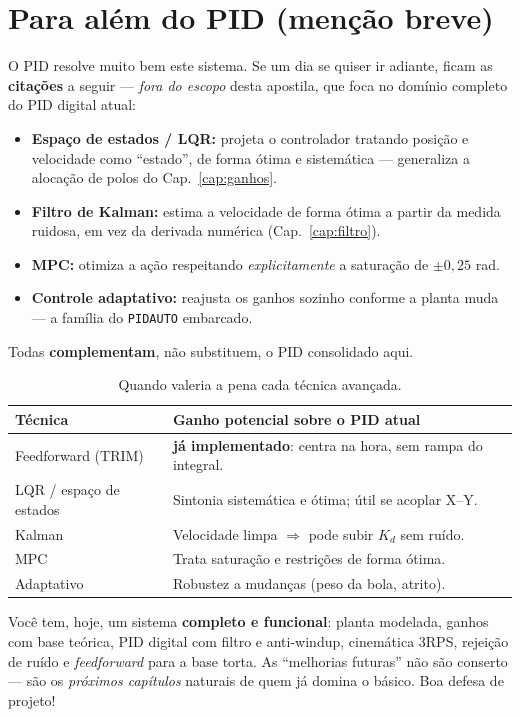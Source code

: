 \section{Para al\'em do PID (men\c{c}\~ao breve)}
O PID resolve muito bem este sistema. Se um dia se quiser ir adiante, ficam as
\textbf{cita\c{c}\~oes} a seguir --- \emph{fora do escopo} desta apostila, que foca
no dom\'inio completo do PID digital atual:
\begin{itemize}[leftmargin=1.4em]
  \item \textbf{Espa\c{c}o de estados / LQR:} projeta o controlador tratando
  posi\c{c}\~ao e velocidade como ``estado'', de forma \'otima e sistem\'atica ---
  generaliza a aloca\c{c}\~ao de polos do Cap.~\ref{cap:ganhos}.
  \item \textbf{Filtro de Kalman:} estima a velocidade de forma \'otima a partir da
  medida ruidosa, em vez da derivada num\'erica (Cap.~\ref{cap:filtro}).
  \item \textbf{MPC:} otimiza a a\c{c}\~ao respeitando \emph{explicitamente} a
  satura\c{c}\~ao de $\pm0{,}25$ rad.
  \item \textbf{Controle adaptativo:} reajusta os ganhos sozinho conforme a planta
  muda --- a fam\'ilia do \texttt{PIDAUTO} embarcado.
\end{itemize}
Todas \textbf{complementam}, n\~ao substituem, o PID consolidado aqui.

\begin{table}[h]\centering
\caption{Quando valeria a pena cada t\'ecnica avan\c{c}ada.}
\label{tab:avancado}
\small
\begin{tabularx}{\textwidth}{l X}
\toprule
T\'ecnica & Ganho potencial sobre o PID atual \\
\midrule
Feedforward (TRIM) & \textbf{j\'a implementado}: centra na hora, sem rampa do integral. \\
LQR / espa\c{c}o de estados & Sintonia sistem\'atica e \'otima; \'util se acoplar X--Y. \\
Kalman & Velocidade limpa $\Rightarrow$ pode subir $K_d$ sem ru\'ido. \\
MPC & Trata satura\c{c}\~ao e restri\c{c}\~oes de forma \'otima. \\
Adaptativo & Robustez a mudan\c{c}as (peso da bola, atrito). \\
\bottomrule
\end{tabularx}
\end{table}

\begin{projeto}
Voc\^e tem, hoje, um sistema \textbf{completo e funcional}: planta modelada,
ganhos com base te\'orica, PID digital com filtro e anti-windup, cinem\'atica 3RPS,
rejei\c{c}\~ao de ru\'ido e \emph{feedforward} para a base torta. As ``melhorias
futuras'' n\~ao s\~ao conserto --- s\~ao os \emph{pr\'oximos cap\'itulos} naturais
de quem j\'a domina o b\'asico. Boa defesa de projeto!
\end{projeto}

